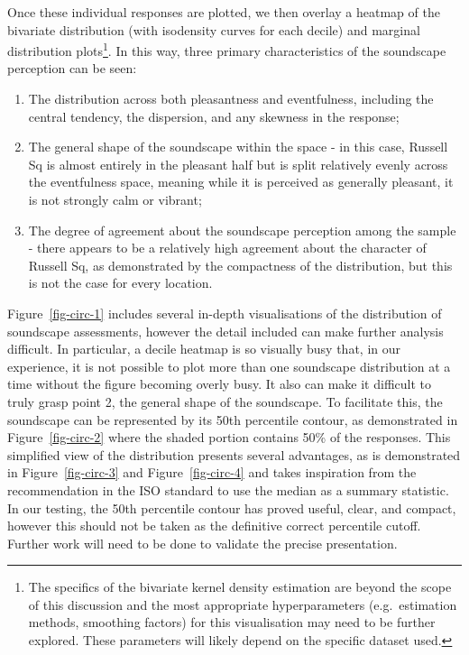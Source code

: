 \documentclass[
  authoryear,
  preprint,
  3p]{elsarticle}
\begin{document}
Once these individual responses are plotted, we then overlay a heatmap
of the bivariate distribution (with isodensity curves for each decile)
and marginal distribution plots\footnote{The specifics of the bivariate
  kernel density estimation \citep{silverman2018density} are beyond the
  scope of this discussion and the most appropriate hyperparameters
  (e.g.~estimation methods, smoothing factors) for this visualisation
  may need to be further explored. These parameters will likely depend
  on the specific dataset used.}. In this way, three primary
characteristics of the soundscape perception can be seen:

\begin{enumerate}
\def\labelenumi{\arabic{enumi}.}
\item
  The distribution across both pleasantness and eventfulness, including
  the central tendency, the dispersion, and any skewness in the
  response;
\item
  The general shape of the soundscape within the space - in this case,
  Russell Sq is almost entirely in the pleasant half but is split
  relatively evenly across the eventfulness space, meaning while it is
  perceived as generally pleasant, it is not strongly calm or vibrant;
\item
  The degree of agreement about the soundscape perception among the
  sample - there appears to be a relatively high agreement about the
  character of Russell Sq, as demonstrated by the compactness of the
  distribution, but this is not the case for every location.
\end{enumerate}

Figure~\ref{fig-circ-1} includes several in-depth visualisations of the
distribution of soundscape assessments, however the detail included can
make further analysis difficult. In particular, a decile heatmap is so
visually busy that, in our experience, it is not possible to plot more
than one soundscape distribution at a time without the figure becoming
overly busy. It also can make it difficult to truly grasp point 2, the
general shape of the soundscape. To facilitate this, the soundscape can
be represented by its 50th percentile contour, as demonstrated in
Figure~\ref{fig-circ-2} where the shaded portion contains 50\% of the
responses. This simplified view of the distribution presents several
advantages, as is demonstrated in Figure~\ref{fig-circ-3} and
Figure~\ref{fig-circ-4} and takes inspiration from the recommendation in
the ISO standard to use the median as a summary statistic. In our
testing, the 50th percentile contour has proved useful, clear, and
compact, however this should not be taken as the definitive correct
percentile cutoff. Further work will need to be done to validate the
precise presentation.
\end{document}
